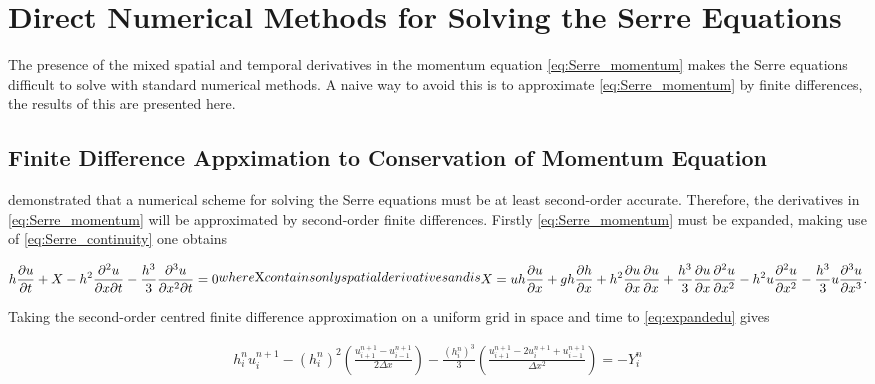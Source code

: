 \documentclass[SingleSpace,12pt,Proceedings]{Serre_ASCE}
\begin{document}
\section{Direct Numerical Methods for Solving the Serre Equations} 
\label{sec:DirNumMet}
The presence of the mixed spatial and temporal derivatives in the momentum equation \eqref{eq:Serre_momentum} makes the Serre equations difficult to solve with standard numerical methods. A naive way to avoid this is to approximate \eqref{eq:Serre_momentum} by finite differences, the results of this are presented here.
\subsection{Finite Difference Appximation to Conservation of Momentum Equation} 
\label{subsec:FDA2conmom}
 demonstrated that a numerical scheme for solving the Serre equations must be at least second-order accurate. Therefore, the derivatives in \eqref{eq:Serre_momentum} will be approximated by second-order finite differences. Firstly \eqref{eq:Serre_momentum} must be expanded, making use of \eqref{eq:Serre_continuity} one obtains
\begin{linenomath*}
\begin{subequations}
\begin{gather}
h\dfrac{\partial u}{\partial t} + X - h^2\frac{\partial^2 u}{\partial x \partial t} - \frac{h^3}{3}\frac{\partial^3 u}{\partial x^2 \partial t}  =0 
\label{eq:expandedu}
\end{gather}
where $X$ contains only spatial derivatives and is
\begin{gather}
X = uh\frac{\partial u}{\partial x} + gh\frac{\partial h}{\partial x} + h^2\frac{\partial u}{\partial x}\frac{\partial u}{\partial x} + \frac{h^3}{3}\frac{\partial u}{\partial x}\frac{\partial^2 u}{\partial x^2} - h^2u\frac{\partial^2 u}{\partial x^2}- \frac{h^3}{3}u\frac{\partial^3 u}{\partial x^3} .
\end{gather}
\end{subequations}
\end{linenomath*} 
Taking the second-order centred finite difference approximation on a uniform grid in space and time to \eqref{eq:expandedu} gives
\begin{linenomath*}
\begin{gather}
h^{n}_iu^{n+1}_i - \left(h^{n}_i\right)^2 \left(\frac{u^{n+1}_{i+1} -u^{n+1}_{i-1} }{2 \Delta x}\right) - \frac{\left(h^{n}_i\right)^3}{3}\left(\frac{u^{n+1}_{i+1} - 2u^{n+1}_{i} + u^{n+1}_{i-1} }{\Delta x^2}\right) = - Y^n_i
\label{eq:expandedutdisc3}
\end{gather}
\end{linenomath*}
\end{document}

